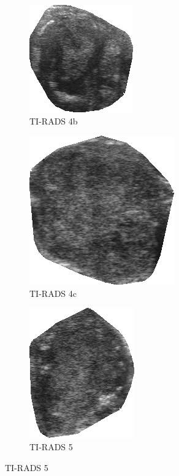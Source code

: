 \documentclass[12pt]{article}
\begin{document}
\begin{figure}[t]
\begin{subfigure}[t]{.3\textwidth}
  \centering
  \includegraphics[width=.6\linewidth]{images/t_4b_crop.png}
  \caption{TI-RADS 4b}
  \label{fig:t4bc}
\end{subfigure}
\hfill
\begin{subfigure}[t]{.3\textwidth}
  \centering
  \includegraphics[width=.6\linewidth]{images/t_4c_crop.png}
  \caption{TI-RADS 4c}
  \label{fig:t4cc}
\end{subfigure}
\hfill
\begin{subfigure}[t]{.3\textwidth}
  \centering
  \includegraphics[width=.6\linewidth]{images/t_5_crop.png}
  \caption{TI-RADS 5}
  \label{fig:t5c}
\end{subfigure}
\label{fig:tcrop}
\end{figure}
\end{document}
